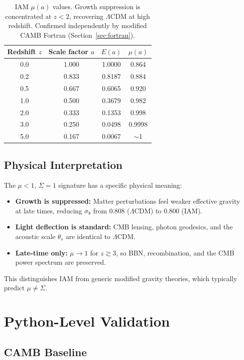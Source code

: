 \documentclass[11pt,letterpaper]{article}
\begin{document}
\begin{table}[h]
\centering
\begin{tabular}{cccc}
\toprule
Redshift $z$ & Scale factor $a$ & $E(a)$ & $\mu(a)$ \\
\midrule
0.0 & 1.000 & 1.0000 & 0.864 \\
0.2 & 0.833 & 0.8187 & 0.884 \\
0.5 & 0.667 & 0.6065 & 0.920 \\
1.0 & 0.500 & 0.3679 & 0.982 \\
2.0 & 0.333 & 0.1353 & 0.998 \\
3.0 & 0.250 & 0.0498 & 0.9998 \\
5.0 & 0.167 & 0.0067 & $\sim$1 \\
\bottomrule
\end{tabular}
\caption{IAM $\mu(a)$ values. Growth suppression is concentrated at $z < 2$, recovering $\Lambda$CDM at high redshift. Confirmed independently by modified CAMB Fortran (Section~\ref{sec:fortran}).}
\label{tab:mu_values}
\end{table}

\subsection{Physical Interpretation}

The $\mu < 1$, $\Sigma = 1$ signature has a specific physical meaning:
\begin{itemize}
\item \textbf{Growth is suppressed:} Matter perturbations feel weaker effective gravity at late times, reducing $\sigma_8$ from 0.808 ($\Lambda$CDM) to 0.800 (IAM).
\item \textbf{Light deflection is standard:} CMB lensing, photon geodesics, and the acoustic scale $\theta_s$ are identical to $\Lambda$CDM.
\item \textbf{Late-time only:} $\mu \to 1$ for $z \gtrsim 3$, so BBN, recombination, and the CMB power spectrum are preserved.
\end{itemize}

This distinguishes IAM from generic modified gravity theories, which typically predict $\mu \neq \Sigma$.

\section{Python-Level Validation}

\subsection{CAMB Baseline}
\end{document}
